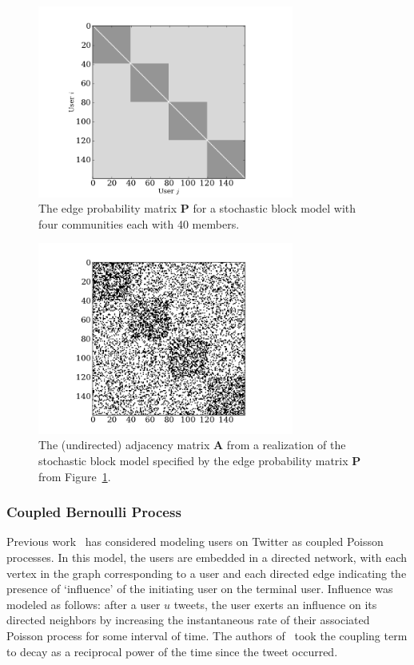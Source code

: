 \documentclass[12pt]{article}
\begin{document}
\begin{figure}[h!]
  \centering
\includegraphics[width=0.75\textwidth]{Figures/prob_mat.png}
\caption{The edge probability matrix \textbf{P} for a stochastic block model with four communities each with 40 members.}
\label{Fig-SBM}
\end{figure}

\begin{figure}[h!]
  \centering
\includegraphics[width=0.75\textwidth]{Figures/adj_mat.png}
\caption{The (undirected) adjacency matrix $\mathbf{A}$ from a realization of the stochastic block model specified by the edge probability matrix \textbf{P} from Figure~\ref{Fig-SBM}.}
\label{Fig-SBM_Realization}
\end{figure}

\subsubsection{Coupled Bernoulli Process}

Previous work~\cite{ver2012information} has considered modeling users on Twitter as coupled Poisson processes. In this model, the users are embedded in a directed network, with each vertex in the graph corresponding to a user and each directed edge indicating the presence of `influence' of the initiating user on the terminal user. Influence was modeled as follows: after a user $u$ tweets, the user exerts an influence on its directed neighbors by increasing the instantaneous rate of their associated Poisson process for some interval of time. The authors of~\cite{ver2012information} took the coupling term to decay as a reciprocal power of the time since the tweet occurred.
\end{document}
